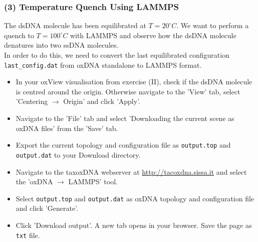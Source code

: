 \documentclass[slidestop,compress,9pt]{beamer}
\begin{document}
\begin{frame}[fragile]
\frametitle{(3) Temperature Quench Using LAMMPS}
\small

The dsDNA molecule has been equilibrated at $T=20^\circ C$. We want to perform a quench to $T=100^\circ C$ with LAMMPS and observe how the dsDNA molecule denatures into two ssDNA molecules.\\[10pt]
In order to do this, we need to convert the last equilibrated configuration \texttt{last\_config.dat} from oxDNA standalone to LAMMPS format.\\[10pt]

\begin{itemize}
\setlength\itemsep{5pt}
\item In your oxView visualisation from exercise (II), check if the dsDNA molecule is centred around the origin. Otherwise navigate to the 'View' tab, select 'Centering $\rightarrow$ Origin' and click 'Apply'.
\item Navigate to the 'File' tab and select 'Downloading the current scene as oxDNA files' from the 'Save' tab. 
\item Export the current topology and configuration file as \texttt{output.top} and \texttt{output.dat} to your Download directory.
\item Navigate to the taxoxDNA webserver at \href{http://tacoxdna.sissa.it}{http://tacoxdna.sissa.it} and select the 'oxDNA $\rightarrow$ LAMMPS' tool.
\item Select \texttt{output.top} and \texttt{output.dat} as oxDNA topology and configuration file and click 'Generate'.
\item Click 'Download output'. A new tab opens in your browser. Save the page as \texttt{txt} file.  
\end{itemize}

\end{frame}
\end{document}
